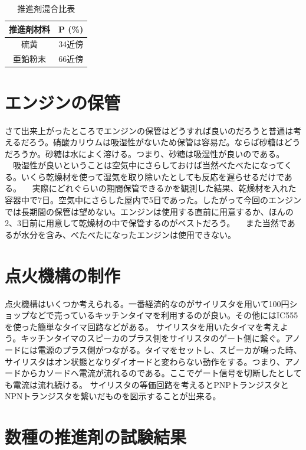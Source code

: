 \begin{table}[H]
\caption{推進剤混合比表}
\centering
\begin{tabular}{c|c}
  推進剤材料	&P (\%)\\ \hline
  硫黄	&34近傍\\
  亜鉛粉末	&66近傍\\ \hline
\end{tabular}
\end{table}

\section{エンジンの保管}
さて出来上がったところでエンジンの保管はどうすれば良いのだろうと普通は考えるだろう。硝酸カリウムは吸湿性がないため保管は容易だ。ならば砂糖はどうだろうか。砂糖は水によく溶ける。つまり、砂糖は吸湿性が良いのである。
　吸湿性が良いということは空気中にさらしておけば当然べたべたになってくる。いくら乾燥材を使って湿気を取り除いたとしても反応を遅らせるだけである。
　実際にどれぐらいの期間保管できるかを観測した結果、乾燥材を入れた容器中で7日。空気中にさらした屋内で5日であった。したがって今回のエンジンでは長期間の保管は望めない。エンジンは使用する直前に用意するか、ほんの2、3日前に用意して乾燥材の中で保管するのがベストだろう。
　また当然であるが水分を含み、べたべたになったエンジンは使用できない。

\section{点火機構の制作}
点火機構はいくつか考えられる。一番経済的なのがサイリスタを用いて100円ショップなどで売っているキッチンタイマを利用するのが良い。その他にはIC555を使った簡単なタイマ回路などがある。
サイリスタを用いたタイマを考えよう。キッチンタイマのスピーカのプラス側をサイリスタのゲート側に繋ぐ。アノードには電源のプラス側がつながる。タイマをセットし、スピーカが鳴った時、サイリスタはオン状態となりダイオードと変わらない動作をする。つまり、アノードからカソードへ電流が流れるのである。ここでゲート信号を切断したとしても電流は流れ続ける。
サイリスタの等価回路を考えるとPNPトランジスタとNPNトランジスタを繋いだものを図示することが出来る。
\section{数種の推進剤の試験結果}
